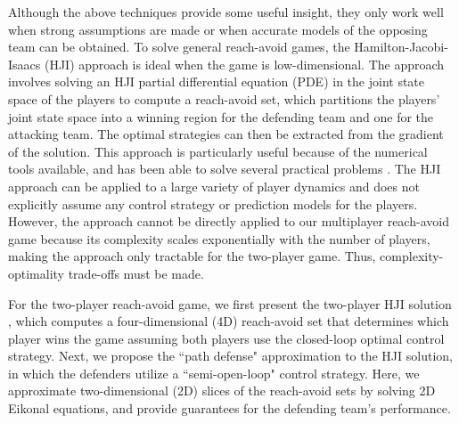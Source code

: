 Although the above techniques provide some useful insight, they only work well when strong assumptions are made or when accurate models of the opposing team can be obtained. To solve general reach-avoid games, the Hamilton-Jacobi-Isaacs (HJI) approach \cite{b:isaacs-1967} is ideal when the game is low-dimensional. The approach involves solving an HJI partial differential equation (PDE) in the joint state space of the players to compute a reach-avoid set, which partitions the players' joint state space into a winning region for the defending team and one for the attacking team. The optimal strategies can then be extracted from the gradient of the solution. This approach is particularly useful because of the numerical tools \cite{j:mitchell-TAC-2005, Sethian1996, b:osher-fedkiw-2002} available, and has been able to solve several practical problems \cite{Huang2011, j:mitchell-TAC-2005, DSST08}. The HJI approach can be applied to a large variety of player dynamics and does not explicitly assume any control strategy or prediction models for the players. However, the approach cannot be directly applied to our multiplayer reach-avoid game because its complexity scales exponentially with the number of players, making the approach only tractable for the two-player game. Thus, complexity-optimality trade-offs must be made.


For the two-player reach-avoid game, we first present the two-player HJI solution \cite{Huang2011}, which computes a four-dimensional (4D) reach-avoid set that determines which player wins the game assuming both players use the closed-loop optimal control strategy. Next, we propose the ``path defense" approximation to the HJI solution, in which the defenders utilize a ``semi-open-loop" control strategy. Here, we approximate two-dimensional (2D) slices of the reach-avoid sets by solving 2D Eikonal equations, and provide guarantees for the defending team's performance.

